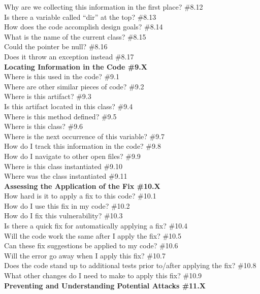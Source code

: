 \documentclass[10pt,journal,compsoc]{IEEEtran}
\begin{document}
	Why are we collecting this information in the first place?  \#8.12 \\
	Is there a variable called ``dir'' at the top?  \#8.13 \\
	How does the code accomplish design goals?  \#8.14 \\
	What is the name of the current class?  \#8.15 \\
	Could the pointer be null?  \#8.16 \\
	Does it throw an exception instead  \#8.17 \\
\textbf{Locating Information in the Code \#9.X} \\
	Where is this used in the code? \#9.1 \\
	Where are other similar pieces of code? \#9.2 \\
	Where is this artifact?  \#9.3 \\
	Is this artifact located in this class? \#9.4 \\
	Where is this method defined?  \#9.5 \\
	Where is this class?  \#9.6 \\
	Where is the next occurrence of this variable?  \#9.7 \\
	How do I track this information in the code? \#9.8 \\
	How do I navigate to other open files? \#9.9 \\
	Where is this class instantiated  \#9.10 \\
	Where was the class instantiated  \#9.11 \\
\textbf{Assessing the Application of the Fix \#10.X} \\
	How hard is it to apply a fix to this code? \#10.1 \\
	How do I use this fix in my code? \#10.2 \\
	How do I fix this vulnerability? \#10.3 \\
	Is there a quick fix for automatically applying a fix? \#10.4 \\
	Will the code work the same after I apply the fix? \#10.5 \\
	Can these fix suggestions be applied to my code? \#10.6 \\
	Will the error go away when I apply this fix? \#10.7 \\
	Does the code stand up to additional tests prior to/after applying the fix?  \#10.8 \\
	What other changes do I need to make to apply this fix? \#10.9 \\
\textbf{Preventing and Understanding Potential Attacks \#11.X} \\
\end{document}
